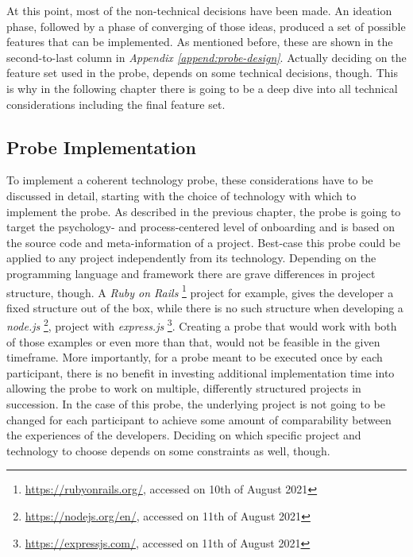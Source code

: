 At this point, most of the non-technical decisions have been made. An ideation phase, followed by a phase of converging of those ideas, produced a set of possible features that can be implemented. As mentioned before, these are shown in the second-to-last column in \textit{Appendix \ref{append:probe-design}}. Actually deciding on the feature set used in the probe, depends on some technical decisions, though. This is why in the following chapter there is going to be a deep dive into all technical considerations including the final feature set.

\subsection{Probe Implementation}

To implement a coherent technology probe, these considerations have to be discussed in detail, starting with the choice of technology with which to implement the probe. As described in the previous chapter, the probe is going to target the psychology- and process-centered level of onboarding and is based on the source code and meta-information of a project. Best-case this probe could be applied to any project independently from its technology. Depending on the programming language and framework there are grave differences in project structure, though. A \textit{Ruby on Rails} \footnote{\url{https://rubyonrails.org/}, accessed on 10th of August 2021} project for example, gives the developer a fixed structure out of the box, while there is no such structure when developing a \textit{node.js} \footnote{\url{https://nodejs.org/en/}, accessed on 11th of August 2021}, project with \textit{express.js} \footnote{\url{https://expressjs.com/}, accessed on 11th of August 2021}. Creating a probe that would work with both of those examples or even more than that, would not be feasible in the given timeframe. More importantly, for a probe meant to be executed once by each participant, there is no benefit in investing additional implementation time into allowing the probe to work on multiple, differently structured projects in succession. In the case of this probe, the underlying project is not going to be changed for each participant to achieve some amount of comparability between the experiences of the developers. Deciding on which specific project and technology to choose depends on some constraints as well, though.

